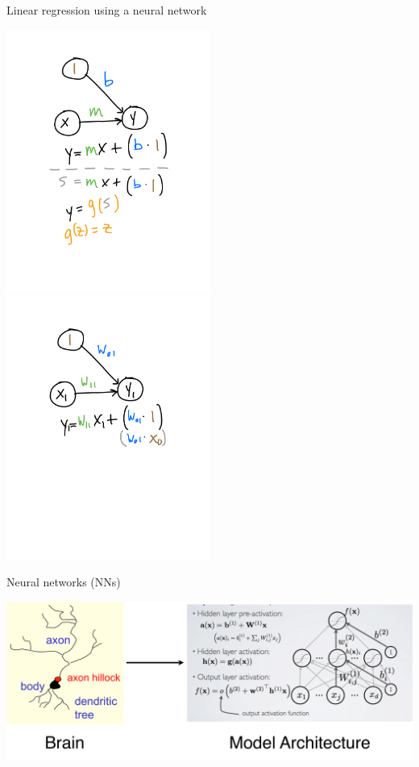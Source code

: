 \documentclass[xetex,compress]{beamer}
\begin{document}
\begin{frame}{Linear regression using a neural network}
  \begin{center}
    \includegraphics[width=0.50\textwidth]{./figures/lr_nn_1.pdf}
    \includegraphics[width=0.50\textwidth]{./figures/lr_nn_3.pdf}
  \end{center}
\end{frame}

\begin{frame}{Neural networks (NNs)}
  \begin{center}
    \includegraphics[width=1.00\textwidth]{./figures/brain_to_model.pdf}
  \end{center}
\end{frame}
\end{document}
